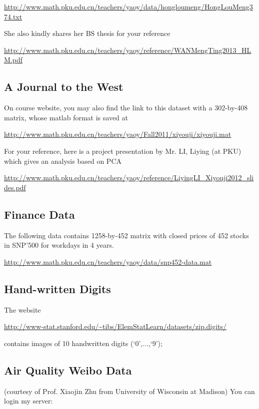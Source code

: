 \documentclass[11pt]{article}
\begin{document}
\url{http://www.math.pku.edu.cn/teachers/yaoy/data/hongloumeng/HongLouMeng374.txt}

\noindent She also kindly shares her BS thesis for your reference
 
 \url{http://www.math.pku.edu.cn/teachers/yaoy/reference/WANMengTing2013_HLM.pdf}


\subsection{A Journal to the West} On course website, you may also find the link to this dataset with a 302-by-408 matrix, whose matlab format is saved at

\url{http://www.math.pku.edu.cn/teachers/yaoy/Fall2011/xiyouji/xiyouji.mat}

For your reference, here is a project presentation by Mr. LI, Liying (at PKU) which gives an analysis based on PCA

\url{http://www.math.pku.edu.cn/teachers/yaoy/reference/LiyingLI_Xiyouji2012_slides.pdf}


\subsection{Finance Data}
The following data contains 1258-by-452 matrix with closed prices of 452 stocks in SNP'500 for workdays in 4 years.

\url{http://www.math.pku.edu.cn/teachers/yaoy/data/snp452-data.mat}


\subsection{Hand-written Digits} The website 

\url{http://www-stat.stanford.edu/\~tibs/ElemStatLearn/datasets/zip.digits/}

contains images of 10 handwritten digits (`$0$',...,`9');


\subsection{Air Quality Weibo Data} (courtesy of Prof. Xiaojin Zhu from University of Wisconsin at Madison) 
You can login my server:
\end{document}
